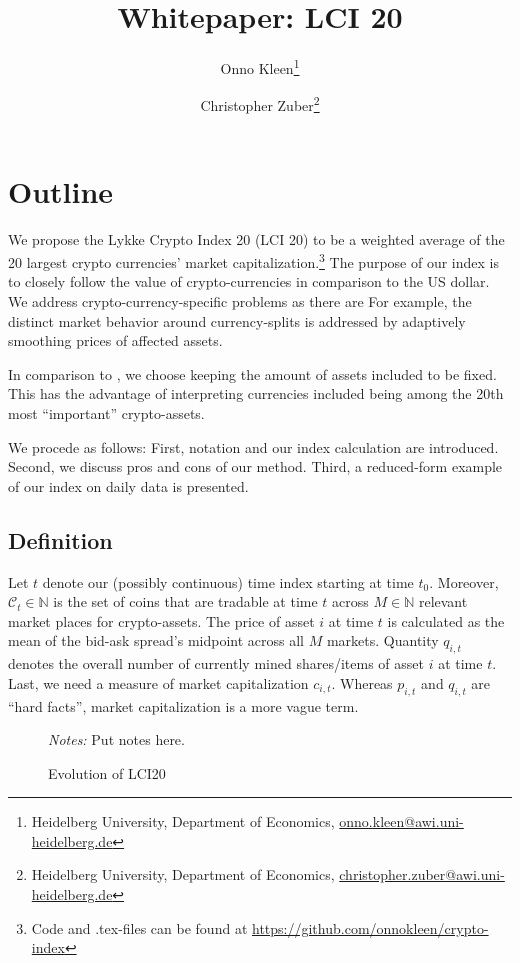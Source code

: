 \documentclass[11pt]{article}
\title{Whitepaper: LCI 20}
\author{
Onno Kleen\thanks{Heidelberg University, Department of Economics, \href{mailto:onno.kleen@awi.uni-heidelberg.de}{onno.kleen@awi.uni-heidelberg.de}}
\and
Christopher Zuber\thanks{Heidelberg University, Department of Economics, \href{mailto:christopher.zuber@awi.uni-heidelberg.de}{christopher.zuber@awi.uni-heidelberg.de}}
}
\newcommand\fnotes[1]{\captionsetup{font=scriptsize}\caption*{\textsl{Notes:} #1}}
\begin{document}
\maketitle
\section{Outline}

We propose the Lykke Crypto Index 20 (LCI 20) to be a weighted average of the 20 largest crypto currencies' market capitalization.\footnote{Code and .tex-files can be found at \href{https://github.com/onnokleen/crypto-index}{https://github.com/onnokleen/crypto-index}}
The purpose of our index is to closely follow the value of crypto-currencies in comparison to the US dollar.
We address crypto-currency-specific problems as there are
For example, the distinct market behavior around currency-splits is addressed by adaptively smoothing prices of affected assets.

In comparison to \cite{Trimborn2016}, we choose keeping the amount of assets included to be fixed.
This has the advantage of interpreting currencies included being among the 20th most ``important'' crypto-assets.

We procede as follows: 
First, notation and our index calculation are introduced. 
Second, we discuss pros and cons of our method.
Third, a reduced-form example of our index on daily data is presented.

\subsection{Definition}

Let $t$ denote our (possibly continuous) time index starting at time $t_0$.
Moreover, $\mathcal{C}_t \in \mathbb{N}$ is the set of coins that are tradable at time $t$ across $M \in \mathbb{N}$ relevant market places for crypto-assets.
The price of asset $i$ at time $t$ is calculated as the mean of the bid-ask spread's midpoint across all $M$ markets.
Quantity $q_{i,t}$ denotes the overall number of currently mined shares/items of asset $i$ at time $t$.
Last, we need a measure of market capitalization $c_{i,t}$.
Whereas $p_{i,t}$ and $q_{i,t}$ are ``hard facts'', market capitalization is a more vague term.

\begin{figure}%
    \centering%
    \caption{Evolution of LCI20}\label{f:lci20}%
    \fnotes{Put notes here.}
\end{figure}
\end{document}
